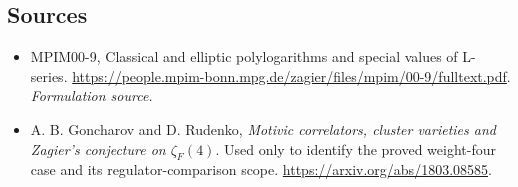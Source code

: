 \documentclass[11pt]{article}
\begin{document}
\subsection{Sources}
\begin{itemize}
\item[S1]MPIM00-9, Classical and elliptic polylogarithms and special values of L-series.
\url{https://people.mpim-bonn.mpg.de/zagier/files/mpim/00-9/fulltext.pdf}.
\textit{Formulation source.}
\item[E1]A. B. Goncharov and D. Rudenko, \textit{Motivic correlators, cluster varieties and Zagier's conjecture on $\zeta_F(4)$}. Used only to identify the proved weight-four case and its regulator-comparison scope.
\url{https://arxiv.org/abs/1803.08585}.

\end{itemize}
\end{document}
